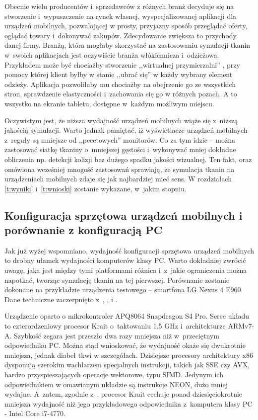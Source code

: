 		Obecnie wielu producentów i~sprzedawców z różnych branż decyduje się na stworzenie i~wypuszczenie na rynek własnej, wyspecjalizowanej aplikacji dla urządzeń mobilnych, pozwalającej w prosty, przyjazny sposób przeglądać oferty, oglądać towary i~dokonywać zakupów. Zdecydowanie zwiększa to przychody danej firmy. Branżą, która mogłaby skorzystać na zastosowaniu symulacji tkanin w~swoich aplikacjach jest oczywiście branża włókiennicza i~odzieżowa. Przykładem może być chociażby stworzenie ,,wirtualnej przymierzalni'' \cite{tryon}, przy pomocy której klient byłby w stanie ,,ubrać się'' w każdy wybrany element odzieży. Aplikacja pozwoliłaby mu chociażby na obejrzenie go ze wszystkich stron, sprawdzenie elastyczności i~zachowania się go w różnych pozach. A to wszystko na ekranie tabletu, dostępne w~każdym możliwym miejscu. 
		
		Oczywistym jest, że niższa wydajność urządzeń mobilnych wiąże się z~niższą jakością symulacji. Warto jednak pamiętać, iż wyświetlacze urządzeń mobilnych z~reguły są mniejsze od ,,pecetowych'' monitorów. Co za tym idzie -- można zastosować siatkę tkaniny o~mniejszej gęstości i~wykonywać mniej dokładne obliczenia np. detekcji kolizji bez dużego spadku jakości wizualnej. Ten fakt, oraz omówiona wcześniej mnogość zastosowań sprawiają, że symulacja tkanin na urządzeniach mobilnych zdaje się jak najbardziej mieć sens. W rozdziałach \ref{t:wyniki} i~\ref{t:wnioski} zostanie wykazane, w~jakim stopniu.
	
		\subsection{Konfiguracja sprzętowa urządzeń mobilnych i porównanie z konfiguracją PC}
		\label{t:technologie:mobilne:konfiguracja}
		
		
		Jak już wyżej wspomniano, wydajność konfiguracji sprzętowa urządzeń mobilnych to drobny ułamek wydajności komputerów klasy PC. Warto dokładniej zwrócić uwagę, jaka jest między tymi platformami różnica i~z~jakie ograniczenia można napotkać, tworząc symulację tkanin na tej pierwszej. Porównanie zostanie dokonane na przykładzie urządzenia testowego -- smartfona LG Nexus 4 E960. Dane techniczne zaczerpnięto z~\cite{specs}, \cite{specs_adreno}, \cite{specs_gtx750} i \cite{specs_gtxtitan}. 
		
		Urządzenie oparto o mikrokontroler APQ8064 Snapdragon S4 Pro. Serce układu to czterordzeniowy procesor Krait o~taktowaniu 1.5 GHz i~architekturze ARMv7-A. Szybkość zegara jest przeszło dwa razy mniejsza niż w~przeciętnym odpowiedniku PC. Można stąd wnioskować, że wydajność okaże się dwukrotnie mniejsza, jednak diabeł tkwi w szczegółach. Dzisiejsze procesory architektury x86 dysponują szerokim wachlarzem specjalnych instrukcji, takich jak SSE czy AVX, bardzo przyspieszających operacje wektorowe, typu SIMD. Jedynym ich odpowiednikiem w omawianym układzie są instrukcje NEON, dużo mniej wydajne. A~zatem, zgodnie z~\cite{versus}, procesor Krait cechuje ponad dziesięciokrotnie mniejsza wydajność niż jego przykładowego odpowiednika z~komputera klasy PC - Intel Core i7-4770.
		
